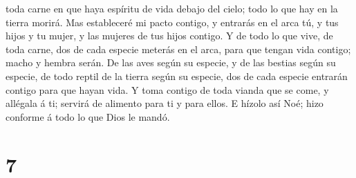 toda carne en que haya espíritu de vida debajo del cielo; todo lo que
hay en la tierra morirá.  Mas estableceré mi pacto
contigo, y entrarás en el arca tú, y tus hijos y tu mujer, y las mujeres
de tus hijos contigo.  Y de todo lo que vive, de toda
carne, dos de cada especie meterás en el arca, para que tengan vida
contigo; macho y hembra serán.  De las aves según su
especie, y de las bestias según su especie, de todo reptil de la tierra
según su especie, dos de cada especie entrarán contigo para que hayan
vida.  Y toma contigo de toda vianda que se come, y
allégala á ti; servirá de alimento para ti y para ellos. 
E hízolo así Noé; hizo conforme á todo lo que Dios le mandó.

\hypertarget{section-6}{%
\section{7}\label{section-6}}

